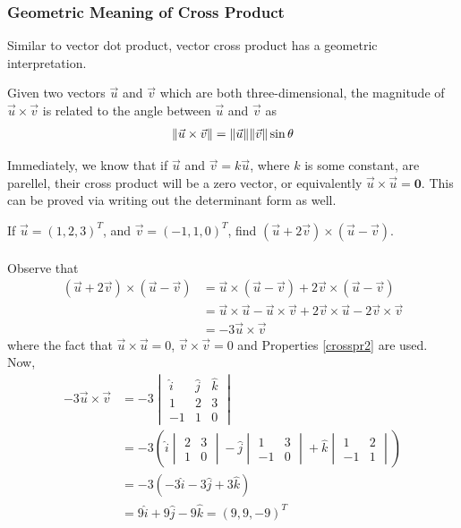\subsubsection{Geometric Meaning of Cross Product} Similar to vector dot product, vector cross product has a geometric interpretation.
\begin{proper}
\label{crossgeo}
Given two vectors $\vec{u}$ and $\vec{v}$ which are both three-dimensional, the magnitude of $\vec{u} \times \vec{v}$ is related to the angle between $\vec{u}$ and $\vec{v}$ as
\begin{align*}
\norm{\vec{u} \times \vec{v}} = \norm{\vec{u}}\norm{\vec{v}}\sin\theta
\end{align*}
\end{proper}
Immediately, we know that if $\vec{u}$ and $\vec{v} = k\vec{u}$, where $k$ is some constant, are parellel, their cross product will be a zero vector, or equivalently $\vec{u} \times \vec{u} = \textbf{0}$. This can be proved via writing out the determinant form as well.

\begin{exmp}
If $\vec{u} = (1,2,3)^T$, and $\vec{v} = (-1,1,0)^T$, find $(\vec{u} + 2\vec{v}) \times (\vec{u} - \vec{v}) $.\\
\\
Observe that
\begin{align*}
(\vec{u} + 2\vec{v}) \times (\vec{u} - \vec{v}) &= \vec{u} \times (\vec{u} - \vec{v}) + 2\vec{v} \times (\vec{u} - \vec{v}) \\
&= \vec{u} \times \vec{u} - \vec{u} \times \vec{v} + 2\vec{v} \times \vec{u} - 2\vec{v} \times \vec{v} \\
&= -3\vec{u} \times \vec{v}
\end{align*}
where the fact that $\vec{u} \times \vec{u} = 0$, $\vec{v} \times \vec{v} = 0$ and Properties \ref{crosspr2} are used. Now,
\begin{align*}
-3\vec{u} \times \vec{v} &=  
-3
\begin{vmatrix}
\hat{i} & \hat{j} & \hat{k} \\
1 & 2 & 3 \\
-1 & 1 & 0
\end{vmatrix} \\
&= -3\left(\hat{i}
\begin{vmatrix}
2 & 3 \\
1 & 0 
\end{vmatrix}
- \hat{j}
\begin{vmatrix}
1 & 3 \\
-1 & 0 
\end{vmatrix}
+ \hat{k}
\begin{vmatrix}
1 & 2 \\
-1 & 1 
\end{vmatrix}\right) \\
&= -3(-3\hat{i}-3\hat{j}+3\hat{k}) \\
&= 9\hat{i}+9\hat{j}-9\hat{k} = (9,9,-9)^T
\end{align*}
\end{exmp}

